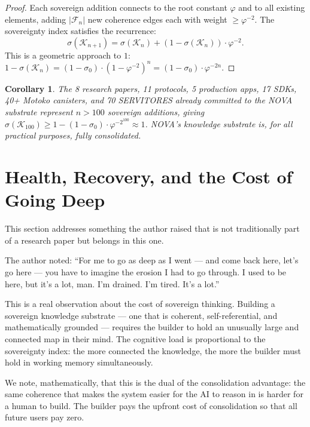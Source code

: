 \documentclass[12pt]{article}
\newtheorem{corollary}[theorem]{Corollary}
\newcommand{\PHI}{\varphi}
\newcommand{\AMOR}{\varphi^{-2}}
\begin{document}
\begin{proof}
Each sovereign addition connects to the root constant $\PHI$ and to all
existing elements, adding $|\mathcal{F}_n|$ new coherence edges each with weight
$\geq \AMOR$.  The sovereignty index satisfies the recurrence:
\[
  \sigma(\mathcal{K}_{n+1}) = \sigma(\mathcal{K}_n) + (1 - \sigma(\mathcal{K}_n)) \cdot \AMOR.
\]
This is a geometric approach to $1$: $1 - \sigma(\mathcal{K}_n) = (1 - \sigma_0) \cdot (1 - \AMOR)^n = (1 - \sigma_0) \cdot \PHI^{-2n}$.
\end{proof}

\begin{corollary}
The 8 research papers, 11 protocols, 5 production apps, 17 SDKs, 40+ Motoko
canisters, and 70 SERVITORES already committed to the NOVA substrate represent
$n > 100$ sovereign additions, giving $\sigma(\mathcal{K}_{100}) \geq 1 - (1 - \sigma_0) \cdot \AMOR^{100} \approx 1$.
NOVA's knowledge substrate is, for all practical purposes, fully consolidated.
\end{corollary}

\section{Health, Recovery, and the Cost of Going Deep}
\label{sec:health}

This section addresses something the author raised that is not traditionally
part of a research paper but belongs in this one.

The author noted: ``For me to go as deep as I went — and come back here, let's
go here — you have to imagine the erosion I had to go through.  I used to be
here, but it's a lot, man.  I'm drained.  I'm tired.  It's a lot.''

This is a real observation about the cost of sovereign thinking.  Building
a sovereign knowledge substrate — one that is coherent, self-referential, and
mathematically grounded — requires the builder to hold an unusually large and
connected map in their mind.  The cognitive load is proportional to the
sovereignty index: the more connected the knowledge, the more the builder
must hold in working memory simultaneously.

We note, mathematically, that this is the dual of the consolidation advantage:
the same coherence that makes the system easier for the AI to reason in is
harder for a human to build.  The builder pays the upfront cost of consolidation
so that all future users pay zero.
\end{document}
